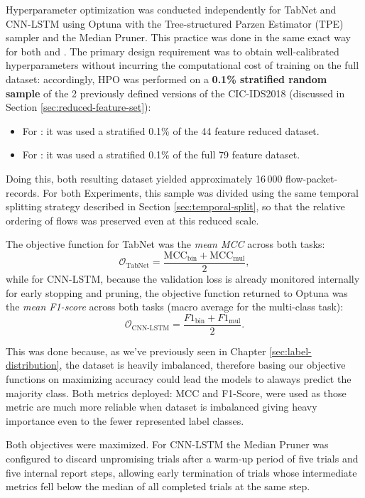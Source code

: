 \documentclass[../main.tex]{subfiles}
\begin{document}
Hyperparameter optimization was conducted independently for TabNet and CNN-LSTM using Optuna with the Tree-structured Parzen Estimator (TPE) sampler and the Median Pruner. This practice was done in the same exact way for both  and . The primary design requirement was to obtain well-calibrated hyperparameters without incurring the computational cost of training on the full dataset: accordingly, HPO was performed on a \textbf{0.1\% stratified random sample} of the 2 previously defined versions of the CIC-IDS2018 (discussed in Section \ref{sec:reduced-feature-set}):
\begin{itemize}
    \item For : it was used a stratified 0.1\% of the 44 feature reduced dataset.
    \item For : it was used a stratified 0.1\% of the full 79 feature dataset.
\end{itemize}
Doing this, both resulting dataset yielded approximately 16\,000 flow-packet-records. For both Experiments, this sample was divided using the same temporal splitting strategy described in Section \ref{sec:temporal-split}, so that the relative ordering of flows was preserved even at this reduced scale.

The objective function for TabNet was the \emph{mean MCC} across both tasks:
\[
    \mathcal{O}_{\text{TabNet}} = \frac{\mathrm{MCC}_{\text{bin}} + \mathrm{MCC}_{\text{mul}}}{2},
\]
while for CNN-LSTM, because the validation loss is already monitored internally for early stopping and pruning, the objective function returned to Optuna was the \emph{mean F1-score} across both tasks (macro average for the multi-class task):
\[
    \mathcal{O}_{\text{CNN-LSTM}} = \frac{F1_{\text{bin}} + F1_{\text{mul}}}{2}.
\]

This was done because, as we've previously seen in Chapter \ref{sec:label-distribution}, the dataset is heavily imbalanced, therefore basing our objective functions on maximizing accuracy could lead the models to alaways predict the majority class. Both metrics deployed: MCC and F1-Score, were used as those metric are much more reliable when dataset is imbalanced giving heavy importance even to the fewer represented label classes.

Both objectives were maximized. For CNN-LSTM the Median Pruner was configured to discard unpromising trials after a warm-up period of five trials and five internal report steps, allowing early termination of trials whose intermediate metrics fell below the median of all completed trials at the same step.
\end{document}
